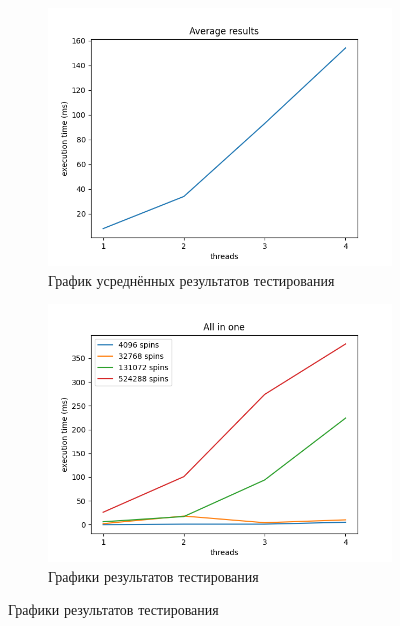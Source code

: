 \begin{figure}[H]
    \centering
    \begin{subfigure}[b]{0.45\textwidth}
        \includegraphics[width=\linewidth]{photo/plot_mid}
        \caption{График усреднённых результатов тестирования}
        \label{fig:plot_mid}
    \end{subfigure}
    \hfill
    \begin{subfigure}[b]{0.45\textwidth}
        \includegraphics[width=\linewidth]{photo/all_in_one}
        \caption{Графики результатов тестирования}
        \label{fig:all_in_one}
    \end{subfigure}
    \caption{Графики результатов тестирования}
\end{figure}
